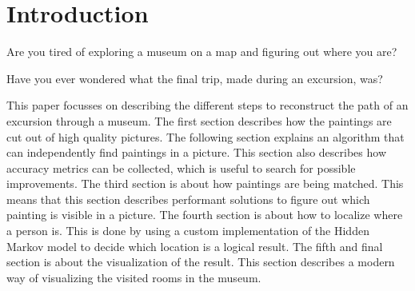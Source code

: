 \section{Introduction}


Are you tired of exploring a museum on a map and figuring out where you are?

Have you ever wondered what the final trip, made during an excursion, was?

This paper focusses on describing the different steps to reconstruct the path of an excursion through a museum. The first section describes how the paintings are cut out of high quality pictures. The following section explains an algorithm that can independently find paintings in a picture. This section also describes how accuracy metrics can be collected, which is useful to search for possible improvements. The third section is about how paintings are being matched. This means that this section describes performant solutions to figure out which painting is visible in a picture. The fourth section is about how to localize where a person is. This is done by using a custom implementation of the Hidden Markov model to decide which location is a logical result. The fifth and final section is about the visualization of the result. This section describes a modern way of visualizing the visited rooms in the museum.
